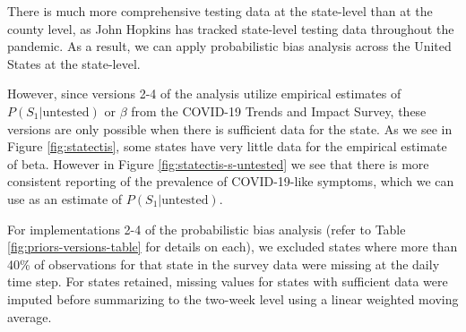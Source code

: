 \documentclass[12pt,twoside]{smiththesis}
\begin{document}
There is much more comprehensive testing data at the state-level than at the county level, as John Hopkins has tracked state-level testing data throughout the pandemic.
As a result, we can apply probabilistic bias analysis across the United States at the state-level.

However, since versions 2-4 of the analysis utilize empirical estimates of \(P(S_1|\text{untested})\) or \(\beta\) from the COVID-19 Trends and Impact Survey, these versions are only possible when there is sufficient data for the state. As we see in Figure \ref{fig:statectis}, some states have very little data for the empirical estimate of beta. However in Figure \ref{fig:statectis-s-untested} we see that there is more consistent reporting of the prevalence of COVID-19-like symptoms, which we can use as an estimate of \(P(S_1|\text{untested})\).

For implementations 2-4 of the probabilistic bias analysis (refer to Table \ref{fig:priors-versions-table} for details on each), we excluded states where more than 40\% of observations for that state in the survey data were missing at the daily time step. For states retained, missing values for states with sufficient data were imputed before summarizing to the two-week level using a linear weighted moving average.
\end{document}
